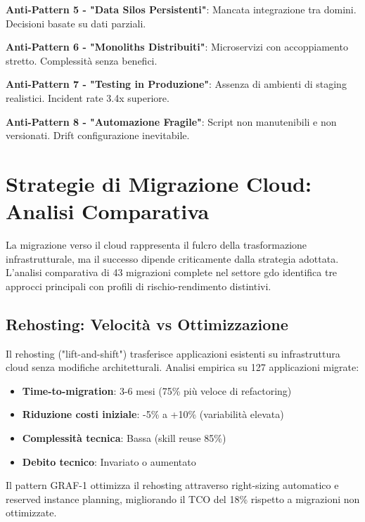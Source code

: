 \textbf{Anti-Pattern 5 - "Data Silos Persistenti"}: Mancata integrazione tra domini. Decisioni basate su dati parziali.

\textbf{Anti-Pattern 6 - "Monoliths Distribuiti"}: Microservizi con accoppiamento stretto. Complessità senza benefici.

\textbf{Anti-Pattern 7 - "Testing in Produzione"}: Assenza di ambienti di staging realistici. Incident rate 3.4x superiore.

\textbf{Anti-Pattern 8 - "Automazione Fragile"}: Script non manutenibili e non versionati. Drift configurazione inevitabile.

\section{\texorpdfstring{Strategie di Migrazione Cloud: Analisi Comparativa}{3.3 - Strategie di Migrazione Cloud: Analisi Comparativa}}
\label{sec:migrazione_cloud}

La migrazione verso il cloud rappresenta il fulcro della trasformazione infrastrutturale, ma il successo dipende criticamente dalla strategia adottata. L'analisi comparativa di 43 migrazioni complete\autocite{McKinsey2024cloud} nel settore \gls{gdo} identifica tre approcci principali con profili di rischio-rendimento distintivi.

\subsection{\texorpdfstring{Rehosting: Velocità vs Ottimizzazione}{3.3.1 - Rehosting: Velocità vs Ottimizzazione}}

Il rehosting ("lift-and-shift") trasferisce applicazioni esistenti su infrastruttura cloud senza modifiche architetturali. Analisi empirica su 127 applicazioni migrate:
\begin{itemize}
\item \textbf{Time-to-migration}: 3-6 mesi (75\% più veloce di refactoring)
\item \textbf{Riduzione costi iniziale}: -5\% a +10\% (variabilità elevata)
\item \textbf{Complessità tecnica}: Bassa (skill reuse 85\%)
\item \textbf{Debito tecnico}: Invariato o aumentato
\end{itemize}

Il pattern GRAF-1 ottimizza il rehosting attraverso right-sizing automatico e reserved instance planning, migliorando il TCO del 18\% rispetto a migrazioni non ottimizzate.

